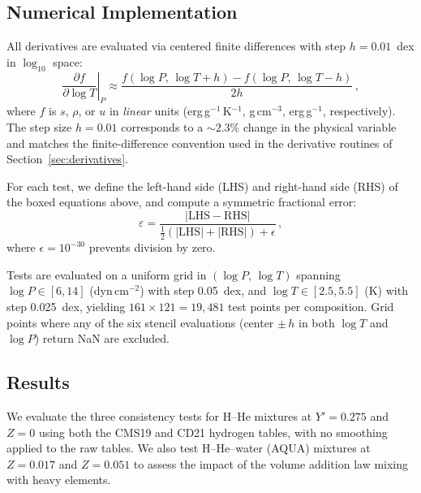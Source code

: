 \documentclass[twocolumn]{aastex701}
\begin{document}
\subsection{Numerical Implementation}

All derivatives are evaluated via centered finite differences with step $h = 0.01$~dex in $\log_{10}$ space:
\begin{equation}
    \left.\frac{\partial f}{\partial \log T}\right|_P
    \approx \frac{f(\log P,\, \log T + h) - f(\log P,\, \log T - h)}{2h}\,,
\end{equation}
where $f$ is $s$, $\rho$, or $u$ in \emph{linear} units (erg\,g$^{-1}$\,K$^{-1}$, g\,cm$^{-3}$, erg\,g$^{-1}$, respectively).
The step size $h = 0.01$ corresponds to a $\sim\!2.3\%$ change in the physical variable and matches the finite-difference convention used in the derivative routines of Section~\ref{sec:derivatives}.

For each test, we define the left-hand side (LHS) and right-hand side (RHS) of the boxed equations above, and compute a symmetric fractional error:
\begin{equation}\label{eq:frac_error}
    \varepsilon = \frac{|\text{LHS} - \text{RHS}|}
    {\tfrac{1}{2}(|\text{LHS}| + |\text{RHS}|) + \epsilon}\,,
\end{equation}
where $\epsilon = 10^{-30}$ prevents division by zero.

Tests are evaluated on a uniform grid in $(\log P,\, \log T)$ spanning $\log P \in [6, 14]$ (dyn\,cm$^{-2}$) with step 0.05~dex, and $\log T \in [2.5, 5.5]$ (K) with step 0.025~dex, yielding $161 \times 121 = 19{,}481$ test points per composition.
Grid points where any of the six stencil evaluations (center $\pm\, h$ in both $\log T$ and $\log P$) return NaN are excluded.

\subsection{Results}

We evaluate the three consistency tests for H--He mixtures at $Y' = 0.275$ and $Z = 0$ using both the CMS19 and CD21 hydrogen tables, with no smoothing applied to the raw tables.  We also test H--He--water (AQUA) mixtures at $Z = 0.017$ and $Z = 0.051$ to assess the impact of the volume addition law mixing with heavy elements.
\end{document}
